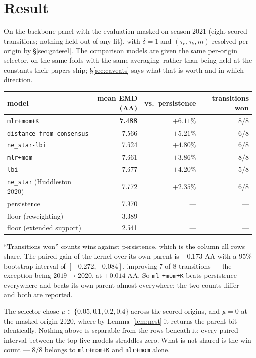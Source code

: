 \documentclass[11pt]{article}
\theoremstyle{remark}
\newcommand{\1}{\mathbf{1}}
\begin{document}
\section{Result}\label{sec:result}

On the backbone panel with the evaluation masked on season 2021 (eight scored
transitions; nothing held out of any fit), with $\delta = 1$ and $(\tau_e, \tau_k, m)$
resolved per origin by \S\ref{sec:gatesel}. The comparison models are given the same
per-origin selector, on the same folds with the same averaging, rather than being held at
the constants their papers ship; \S\ref{sec:caveats} says what that is worth and in which
direction.

\begin{center}
\begin{tabular}{lrrr}
\toprule
model & mean EMD (AA) & vs.\ persistence & transitions won \\
\midrule
\texttt{mlr+mom+K} & \textbf{7.488} & $+6.11\%$ & $8/8$ \\
\texttt{distance\_from\_consensus} & 7.566 & $+5.21\%$ & $6/8$ \\
\texttt{ne\_star-lbi} & 7.624 & $+4.80\%$ & $6/8$ \\
\texttt{mlr+mom} & 7.661 & $+3.86\%$ & $8/8$ \\
\texttt{lbi} & 7.677 & $+4.20\%$ & $5/8$ \\
\texttt{ne\_star} (Huddleston 2020) & 7.772 & $+2.35\%$ & $6/8$ \\
\midrule
persistence & 7.970 & --- & --- \\
floor (reweighting) & 3.389 & --- & --- \\
floor (extended support) & 2.541 & --- & --- \\
\bottomrule
\end{tabular}
\end{center}

\medskip
\noindent
``Transitions won'' counts wins against persistence, which is the column all rows share.
The paired gain of the kernel over its own parent is $-0.173$ AA with a $95\%$ bootstrap
interval of $[-0.272, -0.084]$, improving $7$ of $8$ transitions --- the exception being
$2019 \to 2020$, at $+0.014$ AA. So \texttt{mlr+mom+K} beats persistence everywhere and
beats its own parent almost everywhere; the two counts differ and both are reported.

The selector chose $\mu \in \{0.05, 0.1, 0.2, 0.4\}$ across the scored origins, and
$\mu = 0$ at the masked origin $2020$, where by Lemma~\ref{lem:nest} it returns the parent
bit-identically. Nothing above is separable from the rows beneath it: every paired interval
between the top five models straddles zero. What is not shared is the win count --- $8/8$
belongs to \texttt{mlr+mom+K} and \texttt{mlr+mom} alone.
\end{document}
